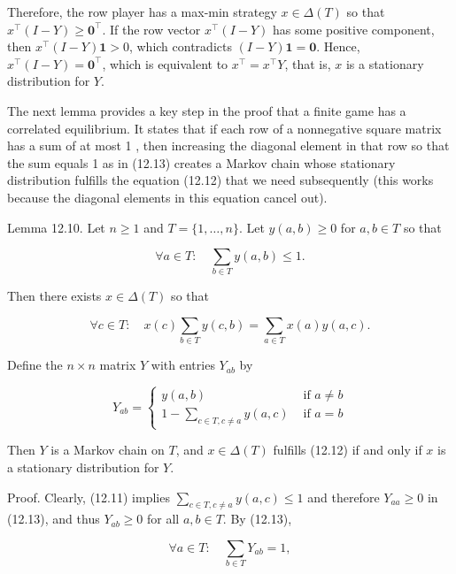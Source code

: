 \documentclass[12pt]{article}
\begin{document}
Therefore, the row player has a max-min strategy $x \in \Delta(T)$ so that $x^{\top}(I-Y) \geq \mathbf{0}^{\top}$. If the row vector $x^{\top}(I-Y)$ has some positive component, then $x^{\top}(I-Y) \mathbf{1}>0$, which contradicts $(I-Y) \mathbf{1}=\mathbf{0}$. Hence, $x^{\top}(I-Y)=\mathbf{0}^{\top}$, which is equivalent to $x^{\top}=x^{\top} Y$, that is, $x$ is a stationary distribution for $Y$.

The next lemma provides a key step in the proof that a finite game has a correlated equilibrium. It states that if each row of a nonnegative square matrix has a sum of at most 1 , then increasing the diagonal element in that row so that the sum equals 1 as in (12.13) creates a Markov chain whose stationary distribution fulfills the equation (12.12) that we need subsequently (this works because the diagonal elements in this equation cancel out).

Lemma 12.10. Let $n \geq 1$ and $T=\{1, \ldots, n\}$. Let $y(a, b) \geq 0$ for $a, b \in T$ so that


\begin{equation*}
\forall a \in T: \quad \sum_{b \in T} y(a, b) \leq 1 . \tag{12.11}
\end{equation*}


Then there exists $x \in \Delta(T)$ so that


\begin{equation*}
\forall c \in T: \quad x(c) \sum_{b \in T} y(c, b)=\sum_{a \in T} x(a) y(a, c) . \tag{12.12}
\end{equation*}


Define the $n \times n$ matrix $Y$ with entries $Y_{a b}$ by

\[
Y_{a b}= \begin{cases}y(a, b) & \text { if } a \neq b  \tag{12.13}\\ 1-\sum_{c \in T, c \neq a} y(a, c) & \text { if } a=b\end{cases}
\]

Then $Y$ is a Markov chain on $T$, and $x \in \Delta(T)$ fulfills (12.12) if and only if $x$ is a stationary distribution for $Y$.

Proof. Clearly, (12.11) implies $\sum_{c \in T, c \neq a} y(a, c) \leq 1$ and therefore $Y_{a a} \geq 0$ in (12.13), and thus $Y_{a b} \geq 0$ for all $a, b \in T$. By (12.13),


\begin{equation*}
\forall a \in T: \quad \sum_{b \in T} Y_{a b}=1, \tag{12.14}
\end{equation*}
\end{document}

